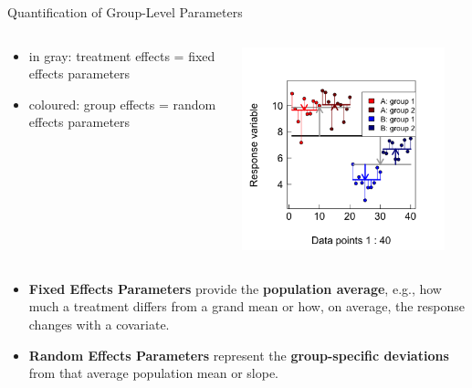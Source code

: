 \documentclass{beamer}
\begin{document}
\begin{frame}{Quantification of Group-Level Parameters}

\begin{columns}[onlytextwidth] 
  \begin{column}{0.4\textwidth}
  \begin{itemize}
      \item in gray: treatment effects = fixed effects parameters
      \item coloured: group effects = random effects parameters
  \end{itemize}
    \end{column}
    \hspace{0.02\textwidth} %
    \begin{column}{0.5\textwidth}
      \begin{center}
        \includegraphics[width=0.9\textwidth]{lectures/day_1_intro_to_mems/figures/unnamed-chunk-35-1.png}
      \end{center}
    \end{column}
  \end{columns}
  
  \begin{itemize}
    \item \textbf{Fixed Effects Parameters} provide the \textbf{population average}, e.g., how much a treatment differs from a grand mean or how, on average, the response changes with a covariate.
    \item \textbf{Random Effects Parameters} represent the \textbf{group-specific deviations} from that average population mean or slope.
  \end{itemize}
  
\end{frame}
\end{document}
